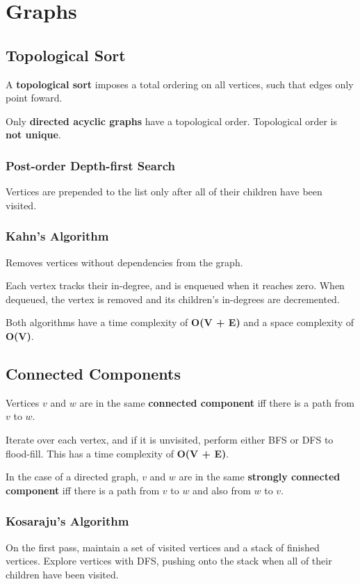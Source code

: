 \section{Graphs}

\subsection{Topological Sort}
A \textbf{topological sort} imposes a total ordering on all vertices, such that edges only point foward.

Only \textbf{directed acyclic graphs} have a topological order.
Topological order is \textbf{not unique}.

\subsubsection{Post-order Depth-first Search}
Vertices are prepended to the list only after all of their children have been visited.

\subsubsection{Kahn's Algorithm}
Removes vertices without dependencies from the graph.

Each vertex tracks their in-degree, and is enqueued when it reaches zero.
When dequeued, the vertex is removed and its children's in-degrees are decremented.

Both algorithms have a time complexity of \textbf{O(V + E)} and a space complexity of \textbf{O(V)}.

\subsection{Connected Components}
Vertices $v$ and $w$ are in the same \textbf{connected component} iff there is a path from $v$ to $w$.

Iterate over each vertex, and if it is unvisited, perform either BFS or DFS to flood-fill.
This has a time complexity of \textbf{O(V + E)}.

In the case of a directed graph, $v$ and $w$ are in the same \textbf{strongly connected component}
iff there is a path from $v$ to $w$ and also from $w$ to $v$.

\subsubsection{Kosaraju's Algorithm}
On the first pass, maintain a set of visited vertices and a stack of finished vertices.
Explore vertices with DFS, pushing onto the stack when all of their children have been visited.

